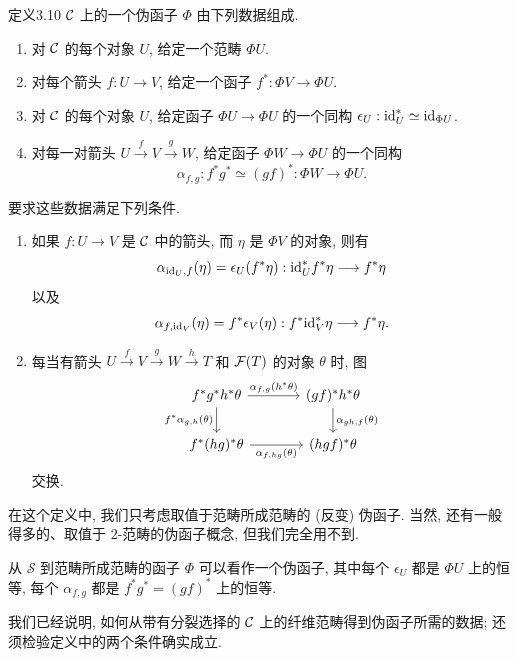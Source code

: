 \begin{origstatement}{定义}{3.10}\label{ch03:def310}
$\mathcal C$ 上的一个伪函子 $\Phi$ 由下列数据组成.
\begin{enumerate}
\item[(i)] 对 $\mathcal C$ 的每个对象 $U$, 给定一个范畴 $\Phi U$.
\item[(ii)] 对每个箭头 $f:U\to V$, 给定一个函子 $f^*:\Phi V\to\Phi U$.
\item[(iii)] 对 $\mathcal C$ 的每个对象 $U$, 给定函子 $\Phi U\to\Phi U$ 的一个同构 $\epsilon_U:\mathrm{id}_U^*\simeq\mathrm{id}_{\Phi U}$.
\item[(iv)] 对每一对箭头 $U\xrightarrow f V\xrightarrow g W$, 给定函子 $\Phi W\to\Phi U$ 的一个同构
\[
\alpha_{f,g}:f^*g^*\simeq(gf)^*:\Phi W\longrightarrow\Phi U.
\]
\end{enumerate}
要求这些数据满足下列条件.
\begin{enumerate}
\item[(a)] 如果 $f:U\to V$ 是 $\mathcal C$ 中的箭头, 而 $\eta$ 是 $\Phi V$ 的对象, 则有
\[
\alpha_{\mathrm{id}_U,f}(\eta)=\epsilon_U(f^*\eta):\mathrm{id}_U^*f^*\eta\longrightarrow f^*\eta
\]
以及
\[
\alpha_{f,\mathrm{id}_V}(\eta)=f^*\epsilon_V(\eta):f^*\mathrm{id}_V^*\eta\longrightarrow f^*\eta.
\]
\item[(b)] 每当有箭头 $U\xrightarrow f V\xrightarrow g W\xrightarrow h T$ 和 $\mathcal F(T)$ 的对象 $\theta$ 时, 图
\[
\begin{tikzcd}[column sep=large]
f^*g^*h^*\theta\arrow[r,"{\alpha_{f,g}(h^*\theta)}"]\arrow[d,"{f^*\alpha_{g,h}(\theta)}"']&(gf)^*h^*\theta\arrow[d,"{\alpha_{gh,f}(\theta)}"]\\
f^*(hg)^*\theta\arrow[r,"{\alpha_{f,hg}(\theta)}"']&(hgf)^*\theta
\end{tikzcd}
\]
交换.
\end{enumerate}
\end{origstatement}

在这个定义中, 我们只考虑取值于范畴所成范畴的 (反变) 伪函子. 当然, 还有一般得多的、取值于 $2$-范畴的伪函子概念, 但我们完全用不到.

从 $\mathcal S$ 到范畴所成范畴的函子 $\Phi$ 可以看作一个伪函子, 其中每个 $\epsilon_U$ 都是 $\Phi U$ 上的恒等, 每个 $\alpha_{f,g}$ 都是 $f^*g^*=(gf)^*$ 上的恒等.

我们已经说明, 如何从带有分裂选择的 $\mathcal C$ 上的纤维范畴得到伪函子所需的数据; 还须检验定义中的两个条件确实成立.

